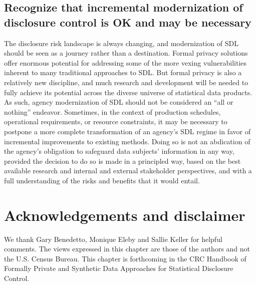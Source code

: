 \subsection{Recognize that incremental modernization of disclosure control is OK and may be necessary}
The disclosure risk landscape is always changing, and modernization of SDL should be seen as a journey rather than a destination. Formal privacy solutions offer enormous potential for addressing some of the more vexing vulnerabilities inherent to many traditional approaches to SDL. But formal privacy is also a relatively new discipline, and much research and development will be needed to fully achieve its potential across the diverse universe of statistical data products. As such, agency modernization of SDL should not be considered an ``all or nothing'' endeavor. Sometimes, in the context of production schedules, operational requirements, or resource constraints, it may be necessary to postpone a more complete transformation of an agency's SDL regime in favor of incremental improvements to existing methods. Doing so is not an abdication of the agency's obligation to safeguard data subjects' information in any way, provided the decision to do so is made in a principled way, based on the best available research and internal and external stakeholder perspectives, and with a full understanding of the risks and benefits that it would entail. 

\section*{Acknowledgements and disclaimer}
We thank Gary Benedetto, Monique Eleby and Sallie Keller for helpful comments. The views expressed in this chapter are those of the authors and not the U.S. Census Bureau. This chapter is forthcoming in the CRC Handbook of Formally Private and Synthetic Data Approaches for Statistical Disclosure Control.







